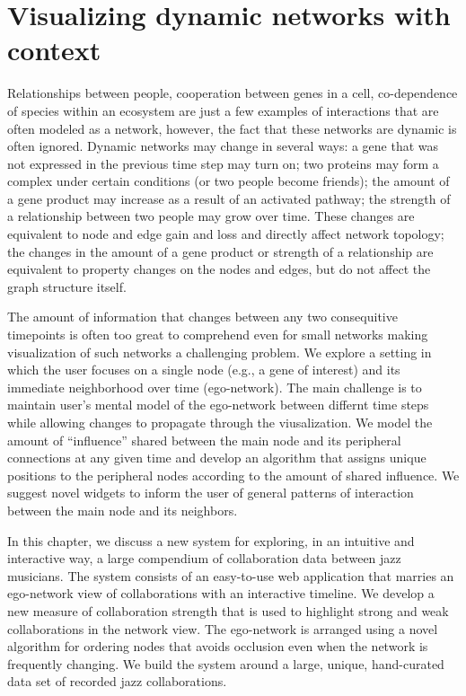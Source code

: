 \documentclass[12pt]{cmuthesis}
\begin{document}





\chapter{Visualizing dynamic networks with context}

Relationships between people, cooperation between genes in a cell, co-dependence of species within an ecosystem are just a few examples of interactions that are often modeled as a network, however, the fact that these networks are dynamic is often ignored. Dynamic networks may change in several ways: a gene that was not expressed in the previous time step may turn on; two proteins may form a complex under certain conditions (or two people become friends); the amount of a gene product may increase as a result of an activated pathway; the strength of a relationship between two people may grow over time. These changes are equivalent to node and edge gain and loss and directly affect network topology; the changes in the amount of a gene product or strength of a relationship are equivalent to property changes on the nodes and edges, but do not affect the graph structure itself.

The amount of information that changes between any two consequitive timepoints is often too great to comprehend even for small networks making visualization of such networks a challenging problem. We explore a setting in which the user focuses on a single node (e.g., a gene of interest) and its immediate neighborhood over time (ego-network). The main challenge is to maintain user's mental model of the ego-network between differnt time steps while allowing changes to propagate through the viusalization. We model the amount of ``influence'' shared between the main node and its peripheral connections at any given time and develop an algorithm that assigns unique positions to the peripheral nodes according to the amount of shared influence. We suggest novel widgets to inform the user of general patterns of interaction between the main node and its neighbors.

In this chapter, we discuss a new system for exploring, in an intuitive and interactive way, a large compendium of collaboration data between jazz musicians. The system consists of an easy-to-use web application that marries an ego-network view of collaborations with an interactive timeline.  We develop a new measure of collaboration strength that is used to highlight strong and weak collaborations in the network view. The ego-network is arranged using a novel algorithm for ordering nodes that avoids occlusion even when the network is frequently changing. We build the system around a large, unique, hand-curated data set of recorded jazz collaborations.
\end{document}

